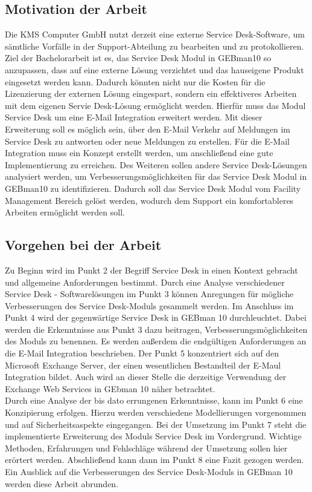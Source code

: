 \subsection{Motivation der Arbeit}
\noindent
Die KMS Computer GmbH nutzt derzeit eine externe Service Desk-Software, um sämtliche Vorfälle in der Support-Abteilung zu bearbeiten und zu protokollieren. Ziel der Bachelorarbeit ist es, das Service Desk Modul in GEBman10 so anzupassen, dass auf eine externe Lösung verzichtet und das hauseigene Produkt eingesetzt werden kann. Dadurch könnten nicht nur die Kosten für die Lizenzierung der externen Lösung eingespart, sondern ein effektiveres Arbeiten mit dem eigenen Servie Desk-Lösung ermöglicht werden. Hierfür muss das Modul Service Desk um eine E-Mail Integration erweitert werden. Mit dieser Erweiterung soll es möglich sein, über den E-Mail Verkehr auf Meldungen im Service Desk zu antworten oder neue Meldungen zu erstellen. Für die E-Mail Integration muss ein Konzept erstellt werden, um anschließend eine gute Implementierung zu erreichen.\newline
Des Weiteren sollen andere Service Desk-Lösungen analysiert werden, um Verbesserungsmöglichkeiten für das Service Desk Modul in GEBman10 zu identifizieren. Dadurch soll das Service Desk Modul vom Facility Management Bereich gelöst werden, wodurch dem Support ein komfortableres Arbeiten ermöglicht werden soll.\\


\subsection{Vorgehen bei der Arbeit}
\noindent
Zu Beginn wird im Punkt 2 der Begriff Service Desk in einen Kontext gebracht und allgemeine Anforderungen bestimmt. Durch eine Analyse verschiedener Service Desk - Softwarelösungen im Punkt 3 können Anregungen für mögliche Verbesserungen des Service Desk-Moduls gesammelt werden. Im Anschluss im Punkt 4 wird der gegenwärtige Service Desk in GEBman 10 durchleuchtet. Dabei werden die Erkenntnisse aus Punkt 3 dazu beitragen, Verbesserungsmöglichkeiten des Moduls zu benennen. Es werden außerdem die endgültigen Anforderungen an die E-Mail Integration beschrieben. Der Punkt 5 konzentriert sich auf den Microsoft Exchange Server, der einen wesentlichen Bestandteil der E-Maul Integration bildet. Auch wird an dieser Stelle die derzeitige Verwendung der Exchange Web Services in GEbman 10 näher betrachtet.\\

\noindent
Durch eine Analyse der bis dato errungenen Erkenntnisse, kann im Punkt 6 eine Konzipierung erfolgen. Hierzu werden verschiedene Modellierungen vorgenommen und auf Sicherheitsaspekte eingegangen. Bei der Umsetzung im Punkt 7 steht die implementierte Erweiterung des Moduls Service Desk im Vordergrund. Wichtige Methoden, Erfahrungen und Fehlschläge während der Umsetzung sollen hier erörtert werden. Abschließend kann dann im Punkt 8 eine Fazit gezogen werden. Ein Ausblick auf die Verbesserungen des Service Desk-Moduls in GEBman 10 werden diese Arbeit abrunden.